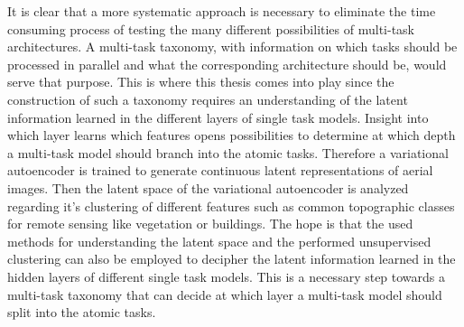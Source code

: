 It is clear that a more systematic approach is necessary to eliminate the time consuming process of testing 
the many different possibilities of multi-task architectures. A multi-task taxonomy, with information on which tasks
should be processed in parallel and what the corresponding architecture should be, would serve that purpose.
This is where this thesis comes into play since the construction of such a taxonomy requires an understanding
of the latent information learned in the different layers of single task models. Insight into which layer
learns which features opens possibilities to determine at which depth a multi-task model should branch
into the atomic tasks. 
Therefore a variational autoencoder is trained to generate continuous latent representations of aerial images.
Then the latent space of the variational autoencoder is analyzed regarding it's clustering of different
features such as common topographic classes for remote sensing like vegetation or buildings. The hope is that 
the used methods for understanding the latent space and the performed unsupervised clustering can also be
employed to decipher the latent information learned in the hidden layers of different single task models. 
This is a necessary step towards a multi-task taxonomy that can decide at which layer a multi-task model
should split into the atomic tasks.